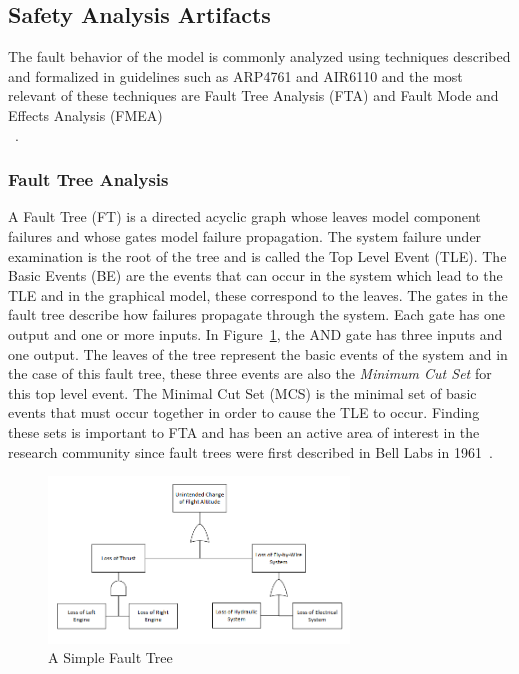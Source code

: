 \subsection{Safety Analysis Artifacts}
\label{sec:artifacts}
The fault behavior of the model is commonly analyzed using techniques described and formalized in guidelines such as ARP4761 and AIR6110 and the most relevant of these techniques are Fault Tree Analysis (FTA) and Fault Mode and Effects Analysis (FMEA)\\~\cite{SAE:ARP4761, AIR6110, 0f356f05e72f43018211b36f97c8854a, Bozzano:2010:DSA:1951720}. 

\subsubsection{Fault Tree Analysis}
A Fault Tree (FT) is a directed acyclic graph whose leaves model component failures and whose gates model failure propagation. The system failure under examination is the root of the tree and is called the Top Level Event (TLE). The Basic Events (BE) are the events that can occur in the system which lead to the TLE and in the graphical model, these correspond to the leaves. The gates in the fault tree describe how failures propagate through the system. Each gate has one output and one or more inputs. In Figure~\ref{fig:introFT}, the AND gate has three inputs and one output. The leaves of the tree represent the basic events of the system and in the case of this fault tree, these three events are also the \textit{Minimum Cut Set} for this top level event. The Minimal Cut Set (MCS) is the minimal set of basic events that must occur together in order to cause the TLE to occur. Finding these sets is important to FTA and has been an active area of interest in the research community since fault trees were first described in Bell Labs in 1961~\cite{historyFTA, 0f356f05e72f43018211b36f97c8854a}. 

\begin{figure}[h]
\begin{center}
\includegraphics[width=8cm]{images/ft.png}
\caption{A Simple Fault Tree} \label{fig:introFT}
\end{center}
\end{figure}

